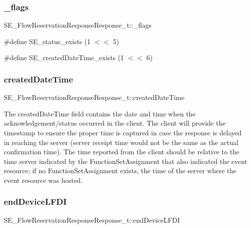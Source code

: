 \subsubsection{\texorpdfstring{\+\_\+flags}{\_flags}}
{\footnotesize\ttfamily S\+E\+\_\+\+Flow\+Reservation\+Response\+Response\+\_\+t\+::\+\_\+flags}

\#define S\+E\+\_\+status\+\_\+exists (1 $<$$<$ 5)

\#define S\+E\+\_\+created\+Date\+Time\+\_\+exists (1 $<$$<$ 6) \mbox{\label{group__FlowReservationResponseResponse_ga12b80e3dcd3a5d9220c7582193c97ae4}} 
\subsubsection{\texorpdfstring{created\+Date\+Time}{createdDateTime}}
{\footnotesize\ttfamily S\+E\+\_\+\+Flow\+Reservation\+Response\+Response\+\_\+t\+::created\+Date\+Time}

The created\+Date\+Time field contains the date and time when the acknowledgement/status occurred in the client. The client will provide the timestamp to ensure the proper time is captured in case the response is delayed in reaching the server (server receipt time would not be the same as the actual confirmation time). The time reported from the client should be relative to the time server indicated by the Function\+Set\+Assignment that also indicated the event resource; if no Function\+Set\+Assignment exists, the time of the server where the event resource was hosted. \mbox{\label{group__FlowReservationResponseResponse_gaf78fcf5a4bf4fb48da0fe100d4d37980}} 
\subsubsection{\texorpdfstring{end\+Device\+L\+F\+DI}{endDeviceLFDI}}
{\footnotesize\ttfamily S\+E\+\_\+\+Flow\+Reservation\+Response\+Response\+\_\+t\+::end\+Device\+L\+F\+DI}

